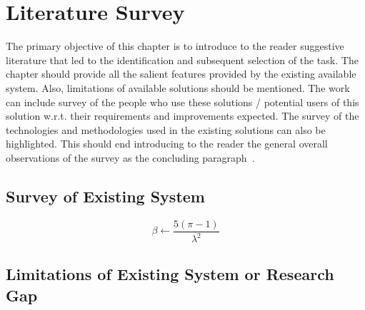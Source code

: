 \chapter{Literature Survey}

The primary objective of this chapter is to introduce to the reader suggestive literature that led to the identification and subsequent selection of the task.  The chapter should provide all the salient features provided by the existing available system. Also, limitations of available solutions should be mentioned. The work can include survey of the people who use these solutions / potential users of this solution w.r.t. their requirements and improvements expected. The survey of the technologies and methodologies used in the existing solutions can also be highlighted. This should end introducing to the reader the general overall observations of the survey as the concluding paragraph~\cite{Chuka-Maduji_Anu_2021}.

\section{Survey of Existing System}\label{soes}

\begin{equation} \label{eq2}
	\beta \leftarrow \frac{5 (\pi - 1)}{\lambda^2} 
\end{equation}

\section{Limitations of Existing System or Research Gap}

